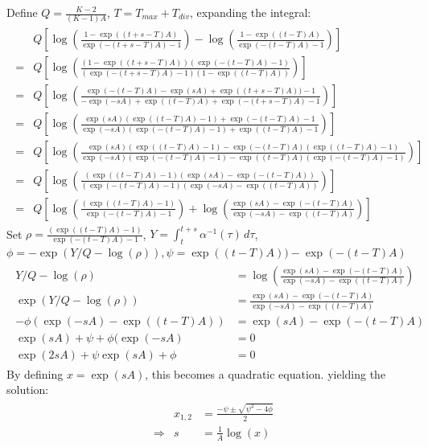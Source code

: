\documentclass{report}
\theoremstyle{definition}
\begin{document}
Define $Q=\frac{K-2}{(K-1)A}$, $T = T_{max}+T_{div}$, expanding the integral:
\begin{gather}
\begin{aligned}
&Q\left[\log(\frac{1-\exp((t+s-T)A)}{\exp(-(t+s-T)A)-1})-\log(\frac{1-\exp((t-T)A)}{\exp(-(t-T)A)-1})\right]\\
=&Q\left[\log(\frac{(1-\exp((t+s-T)A))(\exp(-(t-T)A)-1)}{(\exp(-(t+s-T)A)-1)(1-\exp((t-T)A))})\right]\\
=&Q\left[\log(\frac{\exp(-(t-T)A) - \exp(sA) + \exp((t+s-T)A)) - 1 }{-\exp(-sA) + \exp((t-T)A) + \exp(-(t+s-T)A) - 1})\right]\\
=&Q\left[\log(\frac{\exp(sA)(\exp((t-T)A) - 1)+\exp(-(t-T)A)-1}{\exp(-sA)(\exp(-(t-T)A) - 1)+\exp((t-T)A)-1})\right]\\
=&Q\left[\log(\frac{\exp(sA)(\exp((t-T)A) - 1) - \exp(-(t-T)A)(\exp((t-T)A)-1)}{\exp(-sA)(\exp(-(t-T)A) - 1) - \exp((t-T)A)(\exp(-(t-T)A)-1)})\right]\\
=&Q\left[\log(\frac{(\exp((t-T)A)-1)(\exp(sA)-\exp(-(t-T)A))}{(\exp(-(t-T)A)-1)(\exp(-sA)-\exp((t-T)A))})\right]\\
=&Q\left[\log(\frac{(\exp((t-T)A)-1)}{\exp(-(t-T)A)-1})+\log(\frac{\exp(sA)-\exp(-(t-T)A)}{\exp(-sA)-\exp((t-T)A)})\right]
\end{aligned}
\end{gather}
Set $\rho=\frac{(\exp((t-T)A)-1)}{\exp(-(t-T)A)-1}$, $Y=\int_t^{t+s}{\alpha^{-1}(\tau)\,d\tau}$, $\phi=-\exp(Y/Q-\log(\rho)), \psi = \exp((t-T)A))-\exp(-(t-T)A)$
\begin{gather}
\begin{aligned}
Y/Q - \log(\rho) &= \log(\frac{\exp(sA)-\exp(-(t-T)A)}{\exp(-sA)-\exp((t-T)A)})\\
\exp(Y/Q-\log(\rho)) &= \frac{\exp(sA)-\exp(-(t-T)A)}{\exp(-sA)-\exp((t-T)A)}\\
-\phi(\exp(-sA)-\exp((t-T)A)) &= \exp(sA)-\exp(-(t-T)A)\\
\exp(sA) + \psi + \phi(\exp(-sA) &= 0\\
\exp(2sA) + \psi\exp(sA) + \phi &= 0
\end{aligned}
\end{gather}
By defining $x=\exp(sA)$, this becomes a quadratic equation. yielding the solution:
\begin{gather}
\begin{aligned}
&&x_{1,2} &= \frac{-\psi \pm \sqrt{\psi^2 - 4\phi}}{2}\\
&\Rightarrow& s &= \frac{1}{A}\log(x)
\end{aligned}
\end{gather}
\end{document}

